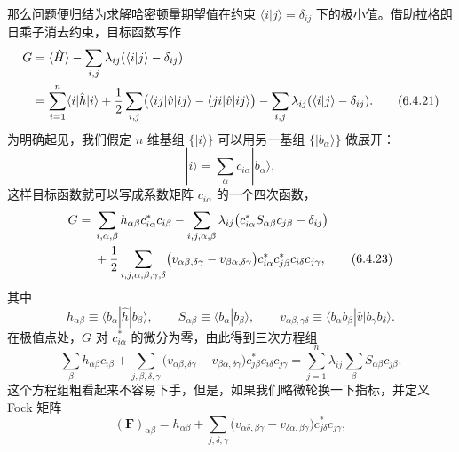 那么问题便归结为求解哈密顿量期望值在约束 $\langle i|j\rangle=\delta_{ij}$ 下的极小值。借助拉格朗日乘子消去约束，目标函数写作
\begin{align}
 G&=\langle\hat H\rangle-\sum_{i,j}\lambda_{ij}(\langle i|j\rangle-\delta_{ij})\notag\\
 &=\sum_{i=1}^{n}\langle i|\hat h|i\rangle
 +\frac12\sum_{i,j}\bigl(\langle ij|\hat v|ij\rangle-\langle ji|\hat v|ij\rangle\bigr)
 -\sum_{i,j}\lambda_{ij}(\langle i|j\rangle-\delta_{ij}).
\tag{6.4.21}
\end{align}
为明确起见，我们假定 $n$ 维基组 $\{|i\rangle\}$ 可以用另一基组 $\{|b_\alpha\rangle\}$ 做展开：
\begin{equation}
 |i\rangle=\sum_\alpha c_{i\alpha}|b_\alpha\rangle,
\tag{6.4.22}
\end{equation}
这样目标函数就可以写成系数矩阵 $c_{i\alpha}$ 的一个四次函数，
\begin{align}
 G={}&\sum_{i,\alpha,\beta}h_{\alpha\beta}c_{i\alpha}^*c_{i\beta}
 -\sum_{i,j,\alpha,\beta}\lambda_{ij}
 \bigl(c_{i\alpha}^*S_{\alpha\beta}c_{j\beta}-\delta_{ij}\bigr)\notag\\
 &+\frac12\sum_{i,j,\alpha,\beta,\gamma,\delta}
 \bigl(v_{\alpha\beta,\delta\gamma}-v_{\beta\alpha,\delta\gamma}\bigr)
 c_{i\alpha}^*c_{j\beta}^*c_{i\delta}c_{j\gamma},
\tag{6.4.23}
\end{align}
其中
\begin{equation}
 h_{\alpha\beta}\equiv\langle b_\alpha|\hat h|b_\beta\rangle,
 \qquad S_{\alpha\beta}\equiv\langle b_\alpha|b_\beta\rangle,
 \qquad v_{\alpha\beta,\gamma\delta}\equiv\langle b_\alpha b_\beta|\hat v|b_\gamma b_\delta\rangle.
\tag{6.4.24}
\end{equation}
在极值点处，$G$ 对 $c_{i\alpha}^*$ 的微分为零，由此得到三次方程组
\begin{equation}
 \sum_\beta h_{\alpha\beta}c_{i\beta}
 +\sum_{j,\beta,\delta,\gamma}
 \bigl(v_{\alpha\beta,\delta\gamma}-v_{\beta\alpha,\delta\gamma}\bigr)
 c_{j\beta}^*c_{i\delta}c_{j\gamma}
 =\sum_{j=1}^{n}\lambda_{ij}\sum_\beta S_{\alpha\beta}c_{j\beta}.
\tag{6.4.25}
\end{equation}
这个方程组粗看起来不容易下手，但是，如果我们略微轮换一下指标，并定义 Fock 矩阵
\begin{equation}
 (\mathbf F)_{\alpha\beta}=h_{\alpha\beta}
 +\sum_{j,\delta,\gamma}\bigl(v_{\alpha\delta,\beta\gamma}-v_{\delta\alpha,\beta\gamma}\bigr)c_{j\delta}^*c_{j\gamma},
\tag{6.4.26}
\end{equation}
